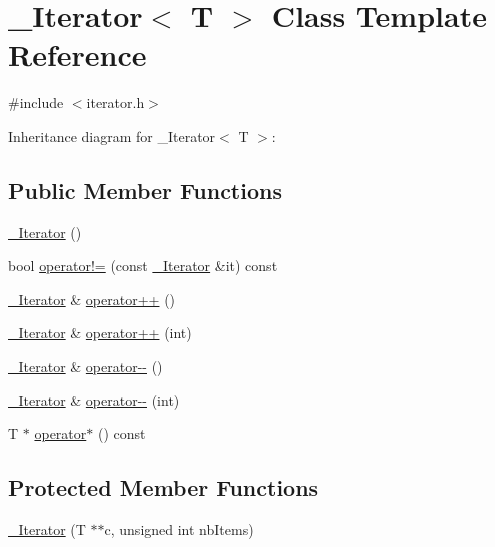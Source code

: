 \hypertarget{class__Iterator}{}\section{\+\_\+\+Iterator$<$ T $>$ Class Template Reference}
\label{class__Iterator}


{\ttfamily \#include $<$iterator.\+h$>$}



Inheritance diagram for \+\_\+\+Iterator$<$ T $>$\+:
\subsection*{Public Member Functions}
\begin{DoxyCompactItemize}
\item 
\hyperlink{class__Iterator_a9a9bbbe870e97f7d091de1511749fb1d}{\+\_\+\+Iterator} ()
\item 
bool \hyperlink{class__Iterator_a52620cef620b6dd4f1de95009919ce3b}{operator!=} (const \hyperlink{class__Iterator}{\+\_\+\+Iterator} \&it) const 
\item 
\hyperlink{class__Iterator}{\+\_\+\+Iterator} \& \hyperlink{class__Iterator_a6bb52c8c33dab6b0dac2c0d4b2af581a}{operator++} ()
\item 
\hyperlink{class__Iterator}{\+\_\+\+Iterator} \& \hyperlink{class__Iterator_afd872a7333b2f25ffa86d98d69cf034b}{operator++} (int)
\item 
\hyperlink{class__Iterator}{\+\_\+\+Iterator} \& \hyperlink{class__Iterator_aaf299bdc04b2449df9f6e8be1b0d89d4}{operator-\/-\/} ()
\item 
\hyperlink{class__Iterator}{\+\_\+\+Iterator} \& \hyperlink{class__Iterator_addd762537b5ece08a5908f33377e82d4}{operator-\/-\/} (int)
\item 
T $\ast$ \hyperlink{class__Iterator_ad43fef696657da4af1dac5409387eb3a}{operator$\ast$} () const 
\end{DoxyCompactItemize}
\subsection*{Protected Member Functions}
\begin{DoxyCompactItemize}
\item 
\hyperlink{class__Iterator_a000cde31674deb63f3222f3d37c14552}{\+\_\+\+Iterator} (T $\ast$$\ast$c, unsigned int nb\+Items)
\end{DoxyCompactItemize}



